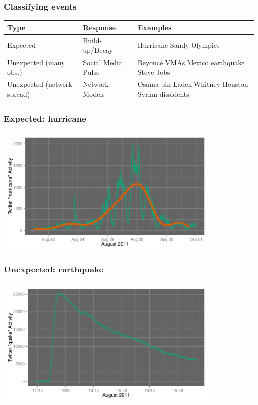 \documentclass{beamer}
\begin{document}

\begin{frame}\frametitle{Classifying events}
\begin{table}
\begin{tabular}{ m{2cm} | m{ 2.5cm} | m{4cm}}
\hline
Type & Response & Examples \\ \hline
Expected    &  Build-up/Decay & Hurricane Sandy \newline Olympics \\ \hline
Unexpected (many obs.) & Social Media \newline Pulse & Beyonc\'{e} VMAs \newline  Mexico earthquake \newline  Steve Jobs \\ \hline
Unexpected  (network spread) & Network \newline Models  & Osama bin Laden \newline  Whitney Houston \newline  Syrian dissidents \\ \hline
\end{tabular}
\end{table}
\end{frame}


\begin{frame}\frametitle{Expected: hurricane}
  \begin{center}
    \includegraphics[width=11cm]{./imgs/SMP_hurricane_trend.pdf}
  \end{center}
\end{frame}



\begin{frame}\frametitle{Unexpected: earthquake}
  \begin{center}
    \includegraphics[width=11cm]{./imgs/SMP_va_quake.pdf}
  \end{center}
\end{frame}
\end{document}
